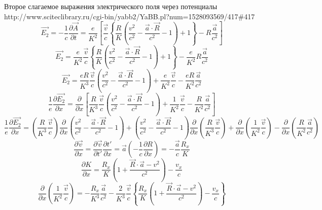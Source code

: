 \documentclass[11pt]{article}
\begin{document}
Второе слагаемое выражения электрического поля через потенциалы
http://www.sciteclibrary.ru/cgi-bin/yabb2/YaBB.pl?num=1528093569/417\#417
\[\overrightarrow{{{E}_{2}}}=-\frac{1}{c}\frac{\partial \overrightarrow{A}}{\partial t}=\frac{e}{{{K}^{2}}}\left[ \frac{\overrightarrow{v}}{c}\left\{ \frac{R}{K}\left( \frac{{{v}^{2}}}{{{c}^{2}}}-\frac{\overrightarrow{a}\cdot \overrightarrow{R}}{{{c}^{2}}}-1 \right)+1 \right\}-R\frac{\overrightarrow{a}}{{{c}^{2}}} \right]\]
\[\overrightarrow{{{E}_{2}}}=\frac{e}{{{K}^{2}}}\frac{\overrightarrow{v}}{c}\left\{ \frac{R}{K}\left( \frac{{{v}^{2}}}{{{c}^{2}}}-\frac{\overrightarrow{a}\cdot \overrightarrow{R}}{{{c}^{2}}}-1 \right)+1 \right\}-\frac{e}{{{K}^{2}}}R\frac{\overrightarrow{a}}{{{c}^{2}}}\]
\[\overrightarrow{{{E}_{2}}}=\frac{eR}{{{K}^{3}}}\frac{\overrightarrow{v}}{c}\left( \frac{{{v}^{2}}}{{{c}^{2}}}-\frac{\overrightarrow{a}\cdot \overrightarrow{R}}{{{c}^{2}}}-1 \right)+\frac{e}{{{K}^{2}}}\frac{\overrightarrow{v}}{c}-\frac{eR}{{{K}^{2}}}\frac{\overrightarrow{a}}{{{c}^{2}}}\]
\[\frac{1}{e}\frac{\partial \overrightarrow{{{E}_{2}}}}{\partial x}=\frac{\partial }{\partial x}\left[ \frac{R}{{{K}^{3}}}\frac{\overrightarrow{v}}{c}\left( \frac{{{v}^{2}}}{{{c}^{2}}}-\frac{\overrightarrow{a}\cdot \overrightarrow{R}}{{{c}^{2}}}-1 \right)+\frac{1}{{{K}^{2}}}\frac{\overrightarrow{v}}{c}-\frac{R}{{{K}^{2}}}\frac{\overrightarrow{a}}{{{c}^{2}}} \right]\]
\[\frac{1}{e}\frac{\partial \overrightarrow{{{E}_{2}}}}{\partial x}=\left( \frac{R}{{{K}^{3}}}\frac{\overrightarrow{v}}{c} \right)\frac{\partial }{\partial x}\left( \frac{{{v}^{2}}}{{{c}^{2}}}-\frac{\overrightarrow{a}\cdot \overrightarrow{R}}{{{c}^{2}}}-1 \right)+\left( \frac{{{v}^{2}}}{{{c}^{2}}}-\frac{\overrightarrow{a}\cdot \overrightarrow{R}}{{{c}^{2}}}-1 \right)\frac{\partial }{\partial x}\left( \frac{R}{{{K}^{3}}}\frac{\overrightarrow{v}}{c} \right)+\frac{\partial }{\partial x}\left( \frac{1}{{{K}^{2}}}\frac{\overrightarrow{v}}{c} \right)-\frac{\partial }{\partial x}\left( \frac{R}{{{K}^{2}}}\frac{\overrightarrow{a}}{{{c}^{2}}} \right)\]
\[\frac{\partial \overrightarrow{v}}{\partial x}=\frac{\partial \overrightarrow{v}}{\partial t'}\frac{\partial t'}{\partial x}=\overrightarrow{a}\left( -\frac{1}{c}\frac{\partial R}{\partial x} \right)=-\frac{\overrightarrow{a}}{c}\frac{{{R}_{x}}}{K}\]
\[\frac{\partial K}{\partial x}=\frac{{{R}_{x}}}{K}\left( 1+\frac{\overrightarrow{R}\cdot \overrightarrow{a}-{{v}^{2}}}{{{c}^{2}}} \right)-\frac{{{v}_{x}}}{c}\]
\[\frac{\partial }{\partial x}\left( \frac{1}{{{K}^{2}}}\frac{\overrightarrow{v}}{c} \right)=-\frac{{{R}_{x}}}{{{K}^{3}}}\frac{\overrightarrow{a}}{{{c}^{2}}}-\frac{2}{{{K}^{3}}}\frac{\overrightarrow{v}}{c}\left\{ \frac{{{R}_{x}}}{K}\left( 1+\frac{\overrightarrow{R}\cdot \overrightarrow{a}-{{v}^{2}}}{{{c}^{2}}} \right)-\frac{{{v}_{x}}}{c} \right\}\]
\end{document}
